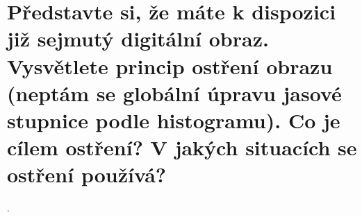 \section{Představte si, že máte k dispozici již sejmutý digitální obraz. Vysvětlete princip ostření obrazu (neptám se 
globální úpravu jasové stupnice podle histogramu). Co je cílem ostření? V jakých situacích se ostření používá?}.